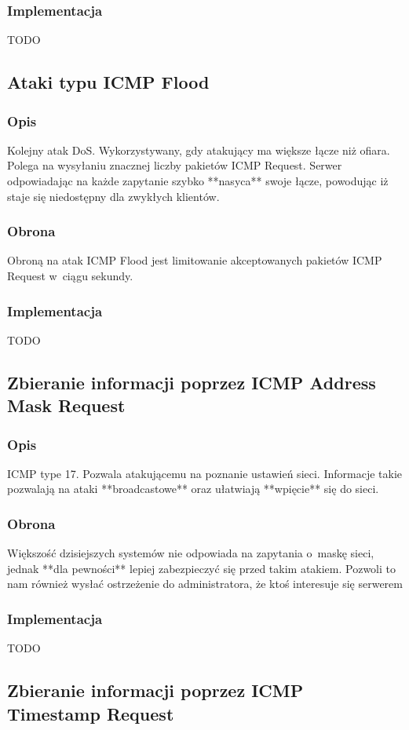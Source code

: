 \documentclass[a4paper,10pt]{article}
\begin{document}
		\subsubsection{Implementacja}
			TODO
	\subsection{Ataki typu ICMP Flood}
		\subsubsection{Opis}
			Kolejny atak DoS. Wykorzystywany, gdy atakujący ma większe łącze niż ofiara. Polega na wysyłaniu znacznej liczby pakietów ICMP Request. Serwer odpowiadając na każde zapytanie szybko **nasyca** swoje łącze, powodując iż staje się niedostępny dla zwykłych klientów.
		\subsubsection{Obrona}
			Obroną na atak ICMP Flood jest limitowanie akceptowanych pakietów ICMP Request w~ciągu sekundy.
		\subsubsection{Implementacja}
			TODO
	\subsection{Zbieranie informacji poprzez ICMP Address Mask Request}
		\subsubsection{Opis}
			ICMP type 17. Pozwala atakującemu na poznanie ustawień sieci. Informacje takie pozwalają na ataki **broadcastowe** oraz ułatwiają **wpięcie** się do sieci.\\
		\subsubsection{Obrona}
			Większość dzisiejszych systemów nie odpowiada na zapytania o~maskę sieci, jednak **dla pewności** lepiej zabezpieczyć się przed takim atakiem. Pozwoli to nam również wysłać ostrzeżenie do administratora, że ktoś interesuje się serwerem
		\subsubsection{Implementacja}
			TODO
	\subsection{Zbieranie informacji poprzez ICMP Timestamp Request}
\end{document}

